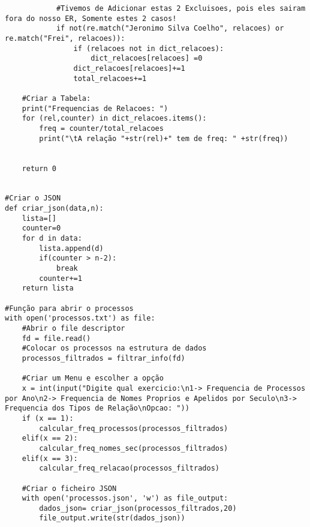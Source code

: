 \documentclass[11pt,a4paper]{report}%
\begin{document}
\begin{verbatim}
            #Tivemos de Adicionar estas 2 Excluisoes, pois eles sairam fora do nosso ER, Somente estes 2 casos!
            if not(re.match("Jeronimo Silva Coelho", relacoes) or re.match("Frei", relacoes)):
                if (relacoes not in dict_relacoes):
                    dict_relacoes[relacoes] =0 
                dict_relacoes[relacoes]+=1
                total_relacoes+=1

    #Criar a Tabela:
    print("Frequencias de Relacoes: ")
    for (rel,counter) in dict_relacoes.items():
        freq = counter/total_relacoes
        print("\tA relação "+str(rel)+" tem de freq: " +str(freq))


    return 0


#Criar o JSON
def criar_json(data,n):
    lista=[]
    counter=0
    for d in data:
        lista.append(d)
        if(counter > n-2):
            break
        counter+=1
    return lista

#Função para abrir o processos
with open('processos.txt') as file:
    #Abrir o file descriptor
    fd = file.read()
    #Colocar os processos na estrutura de dados
    processos_filtrados = filtrar_info(fd)

    #Criar um Menu e escolher a opção
    x = int(input("Digite qual exercicio:\n1-> Frequencia de Processos por Ano\n2-> Frequencia de Nomes Proprios e Apelidos por Seculo\n3-> Frequencia dos Tipos de Relação\nOpcao: "))
    if (x == 1):
        calcular_freq_processos(processos_filtrados)
    elif(x == 2):
        calcular_freq_nomes_sec(processos_filtrados)
    elif(x == 3):
        calcular_freq_relacao(processos_filtrados)

    #Criar o ficheiro JSON
    with open('processos.json', 'w') as file_output:
        dados_json= criar_json(processos_filtrados,20)
        file_output.write(str(dados_json))
\end{verbatim}
\end{document}
